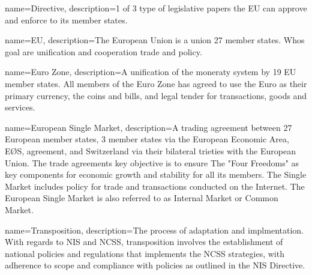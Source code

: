 




{
  name={Directive},
  description={1 of 3 type of legislative papers the EU can approve and enforce to its member states.}
}

{
  name={EU},
  description={The European Union is a union 27 member states. Whos goal are unification and cooperation trade and policy.}
}

{
  name={Euro Zone},
  description={A unification of the moneraty system by 19 EU member states. All members of the Euro Zone has agreed to use the Euro as their primary currency, the coins and bills, and legal tender for transactions, goods and services.}
}

{
  name={European Single Market},
  description={A trading agreement between 27 European member states, 3 member states via the European Economic Area, EØS, agreement, and Switzerland via their bilateral trieties with the European Union. The trade agreements key objective is to ensure The "Four Freedoms" as key components for economic growth and stability for all its members. The Single Market includes policy for trade and transactions conducted on the Internet. The European Single Market is also referred to as Internal Market or Common Market.}
}

{
  name={Transposition},
  description={The process of adaptation and implmentation. With regards to NIS and NCSS, transposition involves the establishment of national policies and regulations that implements the NCSS strategies, with adherence to scope and compliance with policies as outlined in the NIS Directive.}
}










